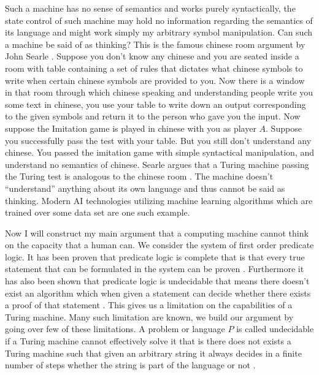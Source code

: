 \documentclass[11pt,a4paper]{article}
\begin{document}
Such a machine has no sense of semantics and works purely syntactically, the state control of such machine may hold no information regarding the semantics of its language and might work simply my arbitrary symbol manipulation.
Can such a machine be said of as thinking? This is the famous chinese room argument by John Searle \cite{Searle}. Suppose you don't know any chinese and you are seated inside a room with table containing a set of rules that dictates what chinese symbols to write when certain chinese symbols are provided to you.
Now there is a window in that room through which chinese speaking and understanding people write you some text in chinese, you use your table to write down an output corresponding to the given symbols and return it to the person who gave you the input. 
Now suppose the Imitation game is played in chinese with you as player $A$. Suppose you successfully pass the test with your table. But you still don't understand any chinese. You passed the imitation game with simple syntactical manipulation, and understand no semantics of chinese. 
Searle argues that a Turing machine passing the Turing test is analogous to the chinese room \cite{Searle}. The machine doesn't ``understand'' anything about its own language and thus cannot be said as thinking.
Modern AI technologies utilizing machine learning algorithms which are trained over some data set are one such example. 
\\\par\vspace*{0.5cm}
Now I will construct my main argument that a computing machine cannot think on the capacity that a human can. 
We consider the system of first order predicate logic. It has been proven that predicate logic is complete that is that every true statement that can be formulated in the system can be proven \cite{Anita}. Furthermore it has also been shown that predicate logic is undecidable that means there doesn't exist an algorithm which when given a statement can decide whether there exists a proof of that statement \cite{Lampert}.
This gives us a limitation on the capabilities of a Turing machine. Many such limitation are known, we build our argument by going over few of these limitations. 
A problem or language $P$ is called undecidable if a Turing machine cannot effectively solve it that is there does not exists a Turing machine such that given an arbitrary string it always decides in a finite number of steps whether the string is part of the language or not \cite{sipser13}.
\end{document}
